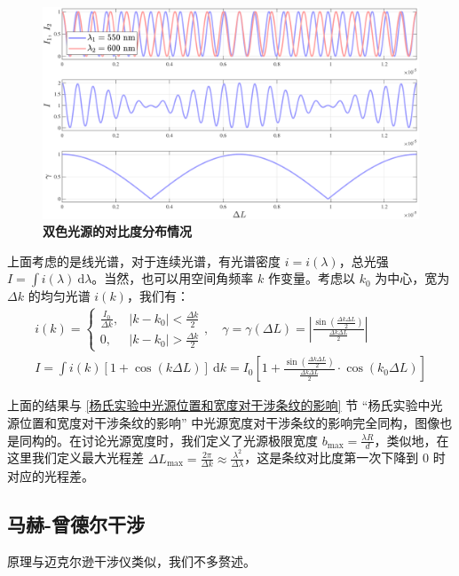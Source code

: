 \documentclass[UTF8]{report}
\theoremstyle{MyLineTheoremStyle} %
\theoremstyle{MyBlockTheoremStyle} %
\theoremstyle{MySubsubsectionStyle} %
\begin{document}
\begin{figure}[H]\centering
\includegraphics[width=0.85\columnwidth]{assets/3/迈克尔逊干涉_双色光源.pdf}
\caption{\bfseries 双色光源的对比度分布情况}\label{双色光源的对比度分布情况}
\end{figure}

上面考虑的是线光谱，对于连续光谱，有光谱密度 $i = i(\lambda)$，总光强 $I = \int i(\lambda)\ \mathrm{d}\lambda$。当然，也可以用空间角频率 $k$ 作变量。考虑以 $k_0$ 为中心，宽为 $\Delta k$ 的均匀光谱 $i(k)$，我们有：
\begin{gather}
i (k) = 
\begin{cases}
    \frac{I_0}{\Delta k}, & |k - k_0| < \frac{\Delta k}{2} \\
    0, & |k - k_0| > \frac{\Delta k}{2}
\end{cases} ,\quad \gamma = \gamma(\Delta L) = \left| \frac{\sin \left(\frac{\Delta k \Delta L}{2}\right)}{\frac{\Delta k \Delta L}{2}} \right| 
\\
I = \int i(k)\left[1 + \cos (k \Delta L)\right] \ \mathrm{d}k = I_0 \left[ 1 + \frac{\sin \left(\frac{\Delta k \Delta L}{2}\right)}{\frac{\Delta k \Delta L}{2}}\cdot \cos (k_0 \Delta L)\right]
\end{gather}

上面的结果与 \ref{杨氏实验中光源位置和宽度对干涉条纹的影响} 节 “杨氏实验中光源位置和宽度对干涉条纹的影响” 中光源宽度对干涉条纹的影响完全同构，图像也是同构的。在讨论光源宽度时，我们定义了光源极限宽度 $b_{\max} = \frac{\lambda R}{d}$，类似地，在这里我们定义最大光程差 $\Delta L_{\max} = \frac{2 \pi}{\Delta k} \approx \frac{\lambda^2}{\Delta \lambda}$，这是条纹对比度第一次下降到 0 时对应的光程差。

\subsection{马赫-曾德尔干涉}

原理与迈克尔逊干涉仪类似，我们不多赘述。
\end{document}
